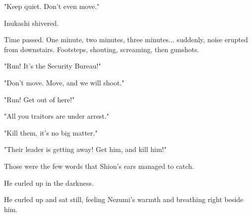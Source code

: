 "Keep quiet. Don't even move."

Inukashi shivered.

Time passed. One minute, two minutes, three minutes... suddenly, noise
erupted from downstairs. Footsteps, shouting, screaming, then gunshots.

"Run! It's the Security Bureau!"

"Don't move. Move, and we will shoot."

"Run! Get out of here!"

"All you traitors are under arrest."

"Kill them, it's no big matter."

"Their leader is getting away! Get him, and kill him!"

Those were the few words that Shion's ears managed to catch.

He curled up in the darkness.

He curled up and sat still, feeling Nezumi's warmth and breathing right
beside him.